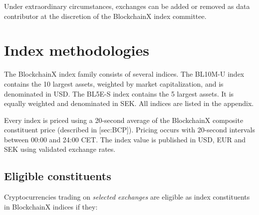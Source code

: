 \documentclass{article}
\begin{document}
Under extraordinary circumstances, exchanges can be added or removed as
data contributor at the discretion of the BlockchainX index committee.

\section{Index methodologies}\label{index-methodologies}

The BlockchainX index family consists of several indices. The BL10M-U
index contains the 10 largest assets, weighted by market capitalization,
and is denominated in USD. The BL5E-S index contains the 5 largest
assets. It is equally weighted and denominated in SEK. All indices are
listed in the appendix.

Every index is priced using a 20-second average of the BlockchainX
composite constituent price (described in {[}sec:BCP{]}). Pricing occurs
with 20-second intervals between 00:00 and 24:00 CET. The index value is
published in USD, EUR and SEK using validated exchange rates.

\subsection{Eligible constituents}\label{sec:eligible-const}

Cryptocurrencies trading on \emph{selected exchanges} are eligible as
index constituents in BlockchainX indices if they:
\end{document}
